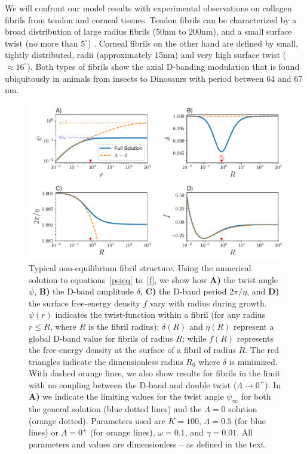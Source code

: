 \documentclass[twoside,twocolumn,9pt]{article}
\begin{document}
We will confront our model results with experimental observations on collagen fibrils from tendon and corneal tissues. Tendon fibrils can be characterized by a broad distribution of large radius fibrils (50nm to 200nm), and a small surface twist (no more than $5^\circ$) \cite{Reale:1981}. Corneal fibrils on the other hand are defined by small, tightly distributed, radii (approximately 15nm) and very high surface twist ($\approx16^\circ$).\cite{Raspanti:2018, Holmes:2001} Both types of fibrils show the axial D-banding modulation that is found ubiquitously in animals from insects \cite{Gray:1959} to Dinosaurs \cite{Boatman:2019} with  period between 64 and 67 nm.

\begin{figure}[h!] %
\centering
  \includegraphics[width=17.1cm]{figure2.pdf}
\caption{Typical non-equilibrium fibril structure. Using the numerical solution to equations~\ref{psieq} to~\ref{f}, we show how \textbf{A)} the twist angle $\psi$, \textbf{B)} the D-band amplitude $\delta$, \textbf{C)} the D-band period $2\pi/\eta$, and \textbf{D)} the surface free-energy density $f$ vary with radius during growth. $\psi(r)$ indicates the twist-function within a fibril (for any  radius $r \leq R$, where $R$ is the fibril radius); $\delta(R)$ and $\eta(R)$ represent a global D-band value for fibrils of radius $R$; while $f(R)$ represents the free-energy density at the surface of a fibril of radius $R$. The red triangles indicate the dimensionless radius $R_0$ where $\delta$ is minimized. With dashed orange lines, we also show results for fibrils in the limit with no coupling between the D-band and double twist ($\Lambda \rightarrow 0^+$). In \textbf{A)} we indicate the limiting values for the twist angle $\psi_\infty$ for both the general solution (blue dotted lines) and the $\Lambda=0$ solution (orange dotted). Parameters used are $K=100$, $\Lambda=0.5$ (for blue lines) or $\Lambda=0^+$ (for orange lines), $\omega=0.1$, and $\gamma = 0.01$. All parameters and values are dimensionless -- as defined in the text.}
  \label{fig:solution}
\end{figure}
\end{document}
